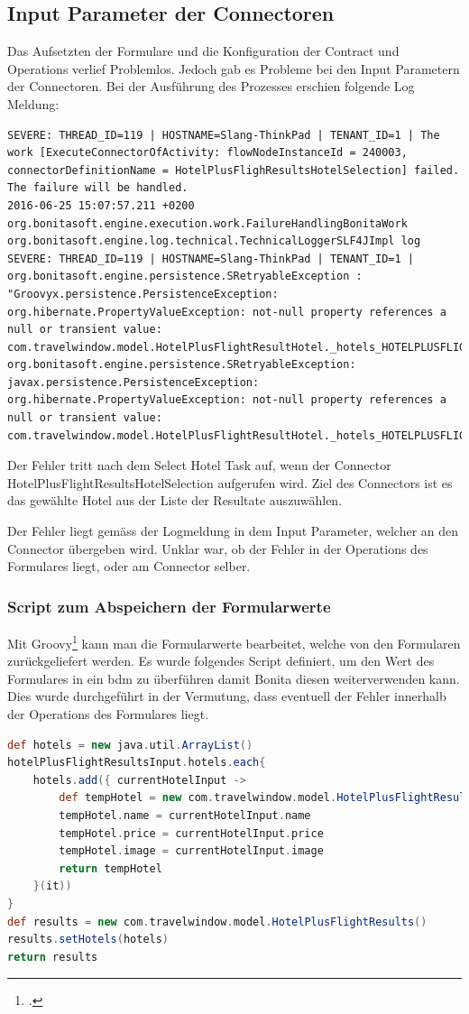 \subsection{Input Parameter der Connectoren}
Das Aufsetzten der Formulare und die Konfiguration der Contract und Operations verlief Problemlos. Jedoch gab es Probleme bei den Input Parametern der Connectoren. Bei der Ausführung des Prozesses erschien folgende Log Meldung:

\begin{lstlisting}[firstnumber=1]
SEVERE: THREAD_ID=119 | HOSTNAME=Slang-ThinkPad | TENANT_ID=1 | The work [ExecuteConnectorOfActivity: flowNodeInstanceId = 240003, connectorDefinitionName = HotelPlusFlighResultsHotelSelection] failed. The failure will be handled.
2016-06-25 15:07:57.211 +0200 org.bonitasoft.engine.execution.work.FailureHandlingBonitaWork org.bonitasoft.engine.log.technical.TechnicalLoggerSLF4JImpl log 
SEVERE: THREAD_ID=119 | HOSTNAME=Slang-ThinkPad | TENANT_ID=1 | org.bonitasoft.engine.persistence.SRetryableException : "Groovyx.persistence.PersistenceException: org.hibernate.PropertyValueException: not-null property references a null or transient value: com.travelwindow.model.HotelPlusFlightResultHotel._hotels_HOTELPLUSFLIGHTRESULTS_PIDBackref"
org.bonitasoft.engine.persistence.SRetryableException: javax.persistence.PersistenceException: org.hibernate.PropertyValueException: not-null property references a null or transient value: com.travelwindow.model.HotelPlusFlightResultHotel._hotels_HOTELPLUSFLIGHTRESULTS_PIDBackref
\end{lstlisting}

Der Fehler tritt nach dem Select Hotel Task auf, wenn der Connector HotelPlusFlightResultsHotelSelection aufgerufen wird. Ziel des Connectors ist es das gewählte Hotel aus der Liste der Resultate auszuwählen.

Der Fehler liegt gemäss der Logmeldung in dem Input Parameter, welcher an den Connector übergeben wird.
Unklar war, ob der Fehler in der Operations des Formulares liegt, oder am Connector selber.

\subsubsection{Script zum Abspeichern der Formularwerte}
Mit Groovy\footcite{Groovy_2016-06-25} kann man die Formularwerte bearbeitet, welche von den Formularen zurückgeliefert werden.
Es wurde folgendes Script definiert, um den Wert des Formulares in ein \gls{bdm} zu überführen damit Bonita diesen weiterverwenden kann. Dies wurde durchgeführt in der Vermutung, dass eventuell der Fehler innerhalb der Operations des Formulares liegt.
\begin{lstlisting}[language=Groovy,firstnumber=1]
def hotels = new java.util.ArrayList()
hotelPlusFlightResultsInput.hotels.each{
	hotels.add({ currentHotelInput ->
		def tempHotel = new com.travelwindow.model.HotelPlusFlightResultHotel()
		tempHotel.name = currentHotelInput.name
		tempHotel.price = currentHotelInput.price
		tempHotel.image = currentHotelInput.image
		return tempHotel
	}(it))
}
def results = new com.travelwindow.model.HotelPlusFlightResults()
results.setHotels(hotels)
return results
\end{lstlisting}

